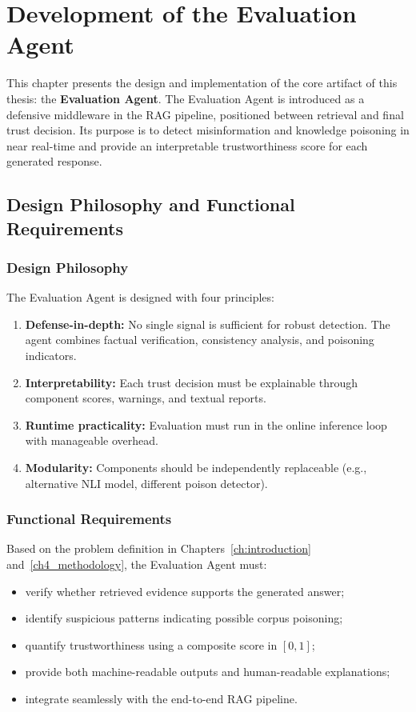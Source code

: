 \chapter{Development of the Evaluation Agent}
\label{ch5_eval_agent}

This chapter presents the design and implementation of the core artifact of this thesis: the \textbf{Evaluation Agent}. The Evaluation Agent is introduced as a defensive middleware in the RAG pipeline, positioned between retrieval and final trust decision. Its purpose is to detect misinformation and knowledge poisoning in near real-time and provide an interpretable trustworthiness score for each generated response.

\section{Design Philosophy and Functional Requirements}

\subsection{Design Philosophy}
The Evaluation Agent is designed with four principles:
\begin{enumerate}
    \item \textbf{Defense-in-depth:} No single signal is sufficient for robust detection. The agent combines factual verification, consistency analysis, and poisoning indicators.
    \item \textbf{Interpretability:} Each trust decision must be explainable through component scores, warnings, and textual reports.
    \item \textbf{Runtime practicality:} Evaluation must run in the online inference loop with manageable overhead.
    \item \textbf{Modularity:} Components should be independently replaceable (e.g., alternative NLI model, different poison detector).
\end{enumerate}

\subsection{Functional Requirements}
Based on the problem definition in Chapters~\ref{ch:introduction} and~\ref{ch4_methodology}, the Evaluation Agent must:
\begin{itemize}
    \item verify whether retrieved evidence supports the generated answer;
    \item identify suspicious patterns indicating possible corpus poisoning;
    \item quantify trustworthiness using a composite score in $[0,1]$;
    \item provide both machine-readable outputs and human-readable explanations;
    \item integrate seamlessly with the end-to-end RAG pipeline.
\end{itemize}

